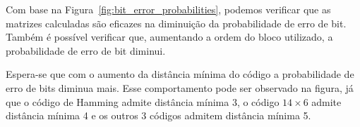 Com base na Figura~\ref{fig:bit_error_probabilities}, podemos verificar que as matrizes calculadas são eficazes na diminuição da probabilidade de erro de bit. Também é possível verificar que, aumentando a ordem do bloco utilizado, a probabilidade de erro de bit diminui. 

Espera-se que com o aumento da distância mínima do código a probabilidade de erro de bits diminua mais. Esse comportamento pode ser observado na figura, já que o código de Hamming admite distância mínima 3, o código $14 \times 6$ admite distância mínima 4 e os outros 3 códigos admitem distância mínima 5.
